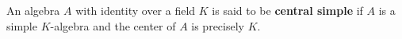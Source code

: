 An algebra $A$ with identity over a field $K$ is said to be \textbf{central simple} if $A$ is a simple $K$-algebra and the center of $A$ is precisely $K$.
